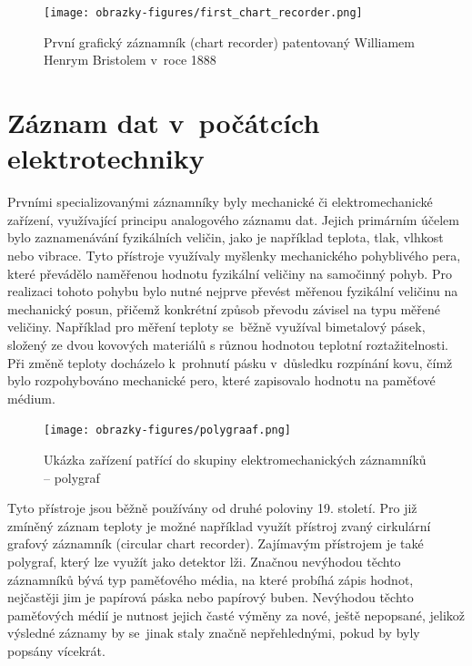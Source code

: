 \begin{figure}[h] %
    \centering
    \texttt{[image: obrazky-figures/first\_chart\_recorder.png]}
    \caption{První grafický záznamník (chart recorder) patentovaný Williamem Henrym Bristolem v~roce 1888~\cite{bristol_chart_recorders}}
    \label{fig:chart_recorder}  
\end{figure}

\section{Záznam dat v~počátcích elektrotechniky}
\label{zaznam}
Prvními specializovanými záznamníky byly mechanické či elektromechanické zařízení, využívající principu analogového záznamu dat. Jejich primárním účelem bylo zaznamenávání fyzikálních veličin, jako je například teplota, tlak, vlhkost nebo vibrace. Tyto přístroje využívaly myšlenky mechanického pohyblivého pera, které převádělo naměřenou hodnotu fyzikální veličiny na samočinný pohyb. Pro realizaci tohoto pohybu bylo nutné nejprve převést měřenou fyzikální veličinu na mechanický posun, přičemž konkrétní způsob převodu závisel na typu měřené veličiny. Například pro měření teploty se~běžně využíval bimetalový pásek, složený ze dvou kovových materiálů s různou hodnotou teplotní roztažitelnosti. Při změně teploty docházelo k~prohnutí pásku v~důsledku rozpínání kovu, čímž bylo rozpohybováno mechanické pero, které zapisovalo hodnotu na paměťové médium.~\cite{thermohydro_graph}


\begin{figure}[h] %
    \centering
    \texttt{[image: obrazky-figures/polygraaf.png]}
    \caption{Ukázka zařízení patřící do skupiny elektromechanických záznamníků -- polygraf~\cite{polygraph_picture}}
    \label{fig:polygraaf}
\end{figure}


Tyto přístroje jsou běžně používány od druhé poloviny 19. století. Pro již zmíněný záznam teploty je možné například využít přístroj zvaný cirkulární grafový záznamník (circular chart recorder). Zajímavým přístrojem je také polygraf, který lze využít jako detektor lži. Značnou nevýhodou těchto záznamníků bývá typ paměťového média, na které probíhá zápis hodnot, nejčastěji jim je papírová páska nebo papírový buben. Nevýhodou těchto paměťových médií je nutnost jejich časté výměny za nové, ještě nepopsané, jelikož výsledné záznamy by se~jinak staly značně nepřehlednými, pokud by byly popsány vícekrát.~\cite{origin_of_chart_recorders}

